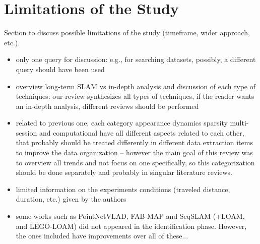 \section{Limitations of the Study}
\label{sec:limitations}

Section to discuss possible limitations of the study (timeframe, wider approach, etc.).

\begin{itemize}[nosep]
\item only one query for discussion: e.g., for searching datasets, possibly, a different query should have been used
\item overview long-term SLAM vs in-depth analysis and discussion of each type of techniques: our review synthesizes all types of techniques, if the reader wants an in-depth analysis, different reviews should be performed
\item related to previous one, each category appearance dynamics sparsity multi-session and computational have all different aspects related to each other, that probably should be treated differently in different data extraction items to improve the data organization -- however the main goal of this review was to overview all trends and not focus on one specifically, so this categorization should be done separately and probably in singular literature reviews.
\item limited information on the experiments conditions (traveled distance, duration, etc.) given by the authors
\item some works such as PointNetVLAD, FAB-MAP and SeqSLAM (+LOAM, and LEGO-LOAM) did not appeared in the identification phase. However, the ones included have improvements over all of these...
\end{itemize}

